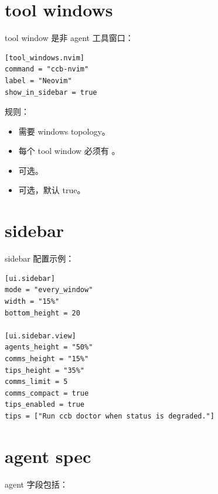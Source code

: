 \section{tool windows}

tool window 是非 agent 工具窗口：

\begin{lstlisting}
[tool_windows.nvim]
command = "ccb-nvim"
label = "Neovim"
show_in_sidebar = true
\end{lstlisting}

规则：

\begin{itemize}
  \item {} 需要 windows topology。
  \item 每个 tool window 必须有 。
  \item {} 可选。
  \item {} 可选，默认 true。
\end{itemize}

\section{sidebar}

sidebar 配置示例：

\begin{lstlisting}
[ui.sidebar]
mode = "every_window"
width = "15%"
bottom_height = 20

[ui.sidebar.view]
agents_height = "50%"
comms_height = "15%"
tips_height = "35%"
comms_limit = 5
comms_compact = true
tips_enabled = true
tips = ["Run ccb doctor when status is degraded."]
\end{lstlisting}

\section{agent spec}

agent 字段包括：

